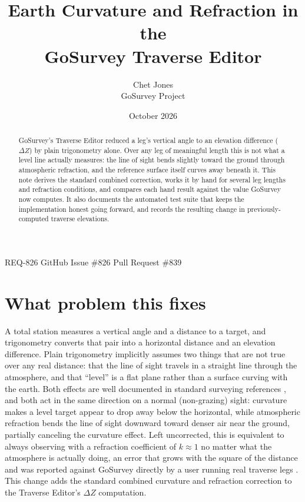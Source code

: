\documentclass[11pt]{article}
\title{\textbf{Earth Curvature and Refraction in the\\GoSurvey Traverse Editor}}
\author{Chet Jones \\ \small GoSurvey Project}
\date{October 2026}
\begin{document}
\maketitle
\vspace{-1.5em}
\begin{center}
\small REQ-826 \quad\textbar\quad GitHub Issue \#826 \quad\textbar\quad Pull Request \#839
\end{center}
\vspace{1em}

\begin{abstract}
\noindent GoSurvey's Traverse Editor reduced a leg's vertical angle to an
elevation difference ($\Delta Z$) by plain trigonometry alone. Over any leg
of meaningful length this is not what a level line actually measures: the
line of sight bends slightly toward the ground through atmospheric
refraction, and the reference surface itself curves away beneath it. This
note derives the standard combined correction, works it by hand for several
leg lengths and refraction conditions, and compares each hand result
against the value GoSurvey now computes. It also documents the automated
test suite that keeps the implementation honest going forward, and records
the resulting change in previously-computed traverse elevations.
\end{abstract}

\section{What problem this fixes}

A total station measures a vertical angle and a distance to a target, and
trigonometry converts that pair into a horizontal distance and an elevation
difference. Plain trigonometry implicitly assumes two things that are not
true over any real distance: that the line of sight travels in a straight
line through the atmosphere, and that ``level'' is a flat plane rather than
a surface curving with the earth. Both effects are well documented in
standard surveying references \citep{ghilaniwolf2015,bannister1998}, and
both act in the same direction on a normal (non-grazing) sight: curvature
makes a level target appear to drop away below the horizontal, while
atmospheric refraction bends the line of sight downward toward denser air
near the ground, partially canceling the curvature effect. Left
uncorrected, this is equivalent to always observing with a refraction
coefficient of $k \approx 1$ no matter what the atmosphere is actually
doing, an error that grows with the square of the distance and was reported
against GoSurvey directly by a user running real traverse legs
\citep{issue826}. This change adds the standard combined curvature and
refraction correction to the Traverse Editor's $\Delta Z$ computation.
\end{document}

